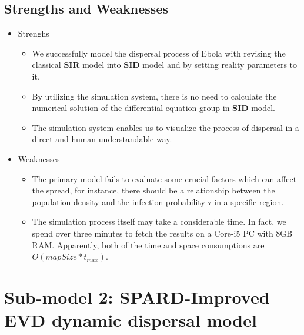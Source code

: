 \subsection{Strengths and Weaknesses}
\begin{itemize}
  \item Strenghs
  \begin{itemize}
    \item We successfully model the dispersal process of Ebola with revising the classical \textbf{SIR} model into \textbf{SID} model and by setting reality parameters to it.
    \item By utilizing the simulation system, there is no need to calculate the numerical solution of the differential equation group in \textbf{SID} model.
    \item The simulation system enables us to visualize the process of dispersal in a direct and human understandable way.
  \end{itemize}
  \item Weaknesses
  \begin{itemize}
    \item The primary model fails to evaluate some crucial factors which can affect the spread, for instance, there should be a relationship between the population density and the infection probability $\tau$ in a specific region.
    \item The simulation process itself may take a considerable time. In fact, we spend over three minutes to fetch the results on a Core-i5 PC with 8GB RAM. Apparently, both of the time and space consumptions are $O(mapSize*t_{max})$.
  \end{itemize}
\end{itemize}

\section{Sub-model 2: SPARD-Improved EVD dynamic dispersal model}

